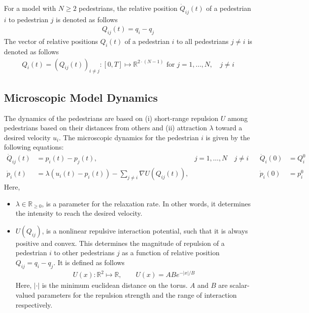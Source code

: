 For a model with $N \geq 2$ pedestrians, the relative position $\dot Q_{ij}(t)$ of a pedestrian $i$ to pedestrian $j$ is denoted as follows
\begin{align*}
    {Q}_{ij}(t) = q_i - q_j
\end{align*}
The vector of relative positions $Q_i(t)$ of a pedestrian $i$ to all pedestrians $j \neq i$ is denoted as follows
\begin{align*}
    {Q}_{i}(t) = ({Q}_{ij}(t))_{i\neq j} : [0,T] \mapsto \mathbb{R}^{2\cdot(N-1)} \text{ for } j = 1,\dots, N, \quad j \neq i
\end{align*}


\subsection{Microscopic Model Dynamics}
\label{section:micro_model_dynamics}
The dynamics of the pedestrians are based on (i) short-range repulsion $U$ among pedestrians based on their distances from others and (ii) attraction $\lambda$ toward a desired velocity $u_i$. The microscopic dynamics for the pedestrian $i$ is given by the following equations:
\begin{equation}
\begin{aligned}
    \dot Q_{ij}(t) &= p_i(t) - p_j(t), &j = 1,\dots,N \quad j \neq i& & \dot Q_i(0) &= Q^0_i \\
    \dot p_i(t) &= \lambda(u_i(t) - p_i(t)) - \sum_{j \neq i} \nabla U (Q_{ij}(t)), && & \dot p_i(0) &= p^0_i
\end{aligned}
\label{eq:micro}
\end{equation}
Here,
\begin{itemize}
    \item $\lambda \in \mathbb{R}_{\geq 0}$, is a parameter for the relaxation rate. In other words, it determines the intensity to reach the desired velocity. 
    \item $U(Q_{ij})$, is a nonlinear repulsive interaction potential, such that it is always positive and convex. This determines the magnitude of repulsion of a pedestrian $i$ to other pedestrians $j$ as a function of relative position $Q_{ij} = q_i - q_j$. It is defined as follows 
    \begin{align} 
        U(x) : \mathbb{R}^2 \mapsto \mathbb{R}, \quad\quad U(x) = ABe^{-|x|/B}
        \label{eq:def_potU}
    \end{align}
    Here, $|\cdot|$ is the minimum euclidean distance on the torus. $A$ and $B$ are scalar-valued parameters for the repulsion strength and the range of interaction respectively.
\end{itemize}

